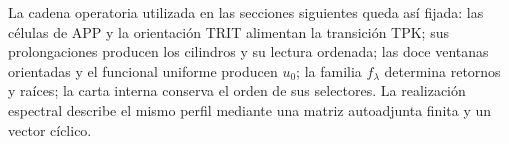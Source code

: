 La cadena operatoria utilizada en las secciones siguientes queda así
fijada: las células de APP y la orientación TRIT alimentan la
transición TPK; sus prolongaciones producen los cilindros y su
lectura ordenada; las doce ventanas orientadas y el funcional uniforme
producen \(u_0\); la familia \(f_\lambda\) determina retornos y raíces;
la carta interna conserva el orden de sus selectores. La realización
espectral describe el mismo perfil mediante una matriz autoadjunta
finita y un vector cíclico.
